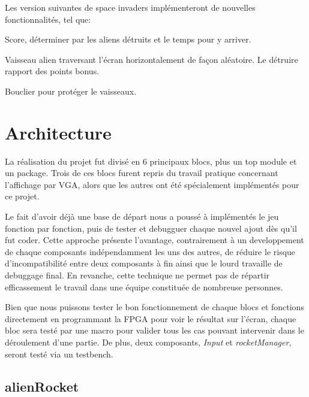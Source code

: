 \documentclass[french]{nakrule}
\begin{document}
Les version suivantes de space invaders implémenteront de nouvelles
fonctionnalités, tel que:\vspace{.1in}
\begin{items}
\item Score, déterminer par les aliens détruits et le temps pour y arriver.
\item Vaisseau alien traversant l'écran horizontalement de façon aléatoire. Le
  détruire rapport des points bonus.
\item Bouclier pour protéger le vaisseaux.
\end{items}

\asymmetricalPage
\chapter{Architecture}
\label{architecture}

La réalisation du projet fut divisé en 6 principaux blocs, plus un top module et
un package. Trois de ces blocs furent repris du travail pratique concernant
l'affichage par VGA, alors que les autres ont été spécialement implémentés pour
ce projet.

Le fait d'avoir déjà une base de départ nous a poussé à implémentés le jeu
fonction par fonction, puis de tester et debugguer chaque nouvel ajout dès qu'il
fut coder. Cette approche présente l'avantage, contrairement à un developpement
de chaque composants indépendamment les uns des autres, de réduire le risque
d'incompatibilité entre deux composants à fin ainsi que le lourd travaille de
debuggage final. En revanche, cette technique ne permet pas de répartir
efficassement le travail dans une équipe constituée de nombreuse personnes.

Bien que nous puissons tester le bon fonctionnement de chaque blocs et fonctions
directement en programmant la FPGA pour voir le résultat sur l'écran, chaque
bloc sera testé par une macro pour valider tous les cas pouvant intervenir dans
le déroulement d'une partie. De plus, deux composants, \emph{Input} et
\emph{rocketManager}, seront testé via un testbench.

\symmetricalPage

\section{alienRocket}
\label{sec:label}
\end{document}
